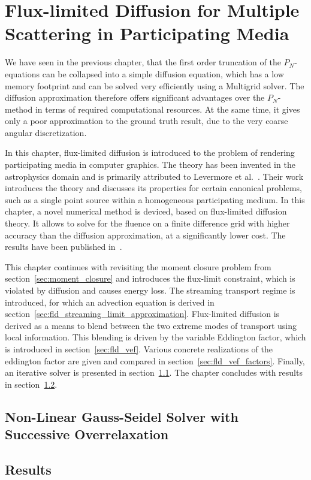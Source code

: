 \chapter{Flux-limited Diffusion for Multiple Scattering in Participating Media}
\label{sec:fld}

We have seen in the previous chapter, that the first order truncation of the $P_N$-equations can be collapsed into a simple diffusion equation, which has a low memory footprint and can be solved very efficiently using a Multigrid solver. The diffusion approximation therefore offers significant advantages over the $P_N$-method in terms of required computational resources. At the same time, it gives only a poor approximation to the ground truth result, due to the very coarse angular discretization.

In this chapter, flux-limited diffusion is introduced to the problem of rendering participating media in computer graphics. The theory has been invented in the astrophysics domain and is primarily attributed to Levermore et al.~\cite{Levermore81}. Their work introduces the theory and discusses its properties for certain canonical problems, such as a single point source within a homogeneous participating medium. In this chapter, a novel numerical method is deviced, based on flux-limited diffusion theory. It allows to solve for the fluence on a finite difference grid with higher accuracy than the diffusion approximation, at a significantly lower cost. The results have been published in~\cite{Koerner14}.

This chapter continues with revisiting the moment closure problem from section~\ref{sec:moment_closure} and introduces the flux-limit constraint, which is violated by diffusion and causes energy loss. The streaming transport regime is introduced, for which an advection equation is derived in section~\ref{sec:fld_streaming_limit_approximation}. Flux-limited diffusion is derived as a means to blend between the two extreme modes of transport using local information. This blending is driven by the variable Eddington factor, which is introduced in section~\ref{sec:fld_vef}. Various concrete realizations of the eddington factor are given and compared in section~\ref{sec:fld_vef_factors}. Finally, an iterative solver is presented in section~\ref{sec:fld_solver}. The chapter concludes with results in section~\ref{sec:fld_results}.









\section{Non-Linear Gauss-Seidel Solver with Successive Overrelaxation}
\label{sec:fld_solver}

\section{Results}
\label{sec:fld_results}


